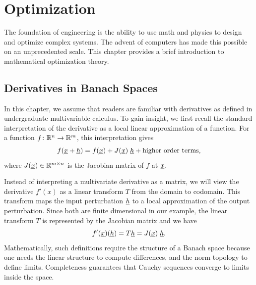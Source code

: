 \chapter{Optimization}




The foundation of engineering is the ability to use math and physics to design and optimize complex systems.
The advent of computers has made this possible on an unprecedented scale.
This chapter provides a brief introduction to mathematical optimization theory.

\section{Derivatives in Banach Spaces}

In this chapter, we assume that readers are familiar with derivatives as defined in undergraduate multivariable calculus.
To gain insight, we first recall the standard interpretation of the derivative as a local linear approximation of a function.
For a function $f\colon \mathbb{R}^n \to \mathbb{R}^m$, this interpretation gives 
\[ f(\underline{x} + \underline{h}) = f(\underline{x}) + J(\underline{x}) \; \underline{h} + \text{higher order terms}, \]
where $J(\underline{x})\in \mathbb{R}^{m\times n}$ is the Jacobian matrix of $f$ at $\underline{x}$.

Instead of interpreting a multivariate derivative as a matrix,  we will view the derivative $f'(x)$ as a linear transform $T$ from the domain to codomain.
This transform maps the input perturbation $\underline{h}$ to a local approximation of the output perturbation.
Since both are finite dimensional in our example, the linear transform $T$ is represented by the Jacobian matrix and we have
\begin{equation*}
f'(\underline{x})(\underline{h}) = T \underline{h} = J(\underline{x}) \; \underline{h} .
\end{equation*}
Mathematically, such definitions require the structure of a Banach space because one needs the linear structure to compute differences, and the norm topology to define limits.
Completeness guarantees that Cauchy sequences converge to limits inside the space.

